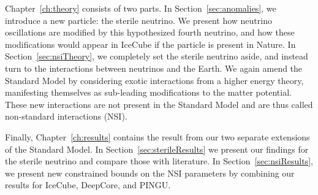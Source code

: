 Chapter~\ref{ch:theory} consists of two parts. In Section~\ref{sec:anomalies}, we 
introduce a new particle: the sterile neutrino. We present how neutrino oscillations are
modified by this hypothesized fourth neutrino, and how these modifications would appear in IceCube if 
the particle is present in Nature. In Section~\ref{sec:nsiTheory}, we completely set the sterile neutrino aside,
and instead turn to the interactions between neutrinos and the Earth. We again amend the Standard Model by 
considering exotic interactions from a higher energy theory, manifesting themselves as sub-leading modifications 
to the matter potential. These new interactions are not present in the Standard Model and are thus called 
non-standard interactions (NSI). 

Finally, Chapter~\ref{ch:results} contains the result from our two separate extensions of the Standard Model.
In Section~\ref{sec:sterileResults} we present our findings for the sterile neutrino and compare those with
literature. In Section~\ref{sec:nsiResults}, we present new constrained bounds on the NSI parameters by 
combining our results for IceCube, DeepCore, and PINGU.